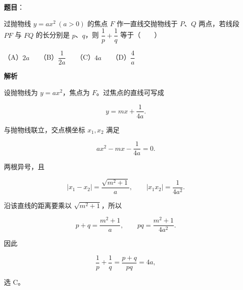 \begin{answer}

\textbf{题目}：

过抛物线 $y=ax^2\ (a>0)$ 的焦点 $F$ 作一直线交抛物线于 $P$、$Q$ 两点，若线段 $PF$ 与 $FQ$ 的长分别是 $p$、$q$，则 $\dfrac1p+\dfrac1q$ 等于\mbox{（　　）}

（A）$2a$　　（B）$\dfrac1{2a}$　　（C）$4a$　　（D）$\dfrac4a$

\textbf{解析}

设抛物线为 $y=ax^2$，焦点为 $F$。过焦点的直线可写成

\nopagebreak[4]
\[
y=mx+\frac1{4a}.
\]

与抛物线联立，交点横坐标 $x_1,x_2$ 满足

\nopagebreak[4]
\[
ax^2-mx-\frac1{4a}=0.
\]

两根异号，且

\nopagebreak[4]
\[
|x_1-x_2|=\frac{\sqrt{m^2+1}}a,\qquad
|x_1x_2|=\frac1{4a^2}.
\]

沿该直线的距离要乘以 $\sqrt{m^2+1}$，所以

\nopagebreak[4]
\[
p+q=\frac{m^2+1}{a},\qquad
pq=\frac{m^2+1}{4a^2}.
\]

因此

\nopagebreak[4]
\[
\frac1p+\frac1q=\frac{p+q}{pq}=4a,
\]

选 C。


\end{answer}
